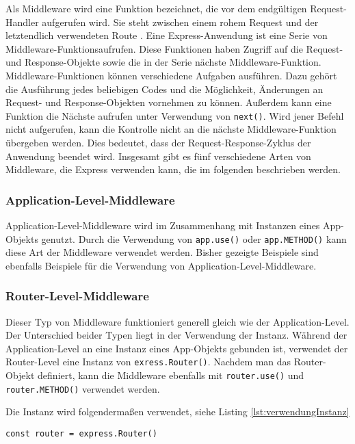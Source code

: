 Als Middleware wird eine Funktion bezeichnet, die vor dem endgültigen Request-Handler aufgerufen wird. Sie steht zwischen einem rohem Request und der letztendlich verwendeten Route \cite{nsieben}.
Eine Express-Anwendung ist eine Serie von Middleware-Funktionsaufrufen. Diese Funktionen haben Zugriff auf die Request- und Response-Objekte sowie die in der Serie nächste Middleware-Funktion. 
Middleware-Funktionen können verschiedene Aufgaben ausführen. Dazu gehört die Ausführung jedes beliebigen Codes und die Möglichkeit, Änderungen an Request- und Response-Objekten vornehmen zu können. Außerdem kann eine Funktion die Nächste aufrufen unter Verwendung von \texttt{next()}. Wird jener Befehl nicht aufgerufen, kann die Kontrolle nicht an die nächste Middleware-Funktion übergeben werden. Dies bedeutet, dass der Request-Response-Zyklus der Anwendung beendet wird.
Insgesamt gibt es fünf verschiedene Arten von Middleware, die Express verwenden kann, die im folgenden beschrieben werden. 

\subsubsection{Application-Level-Middleware}

Application-Level-Middleware wird im Zusammenhang mit Instanzen eines App-Objekts genutzt. Durch die Verwendung von \texttt{app.use()} oder \texttt{app.METHOD()} kann diese Art der Middleware verwendet werden. Bisher gezeigte Beispiele sind ebenfalls Beispiele für die Verwendung von Application-Level-Middleware.

\subsubsection{Router-Level-Middleware}

Dieser Typ von Middleware funktioniert generell gleich wie der Application-Level. Der Unterschied beider Typen liegt in der Verwendung der Instanz. Während der Application-Level an eine Instanz eines App-Objekts gebunden ist, verwendet der Router-Level eine Instanz von \texttt{exress.Router()}. Nachdem man das Router-Objekt definiert, kann die Middleware ebenfalls mit \texttt{router.use()} und \texttt{router.METHOD()} verwendet werden. 

Die Instanz wird folgendermaßen verwendet, siehe Listing \ref*{lst:verwendungInstanz}

\begin{lstlisting}[caption={Verwendung der Instanz}, label={lst:verwendungInstanz}]
    const router = express.Router()
\end{lstlisting}


